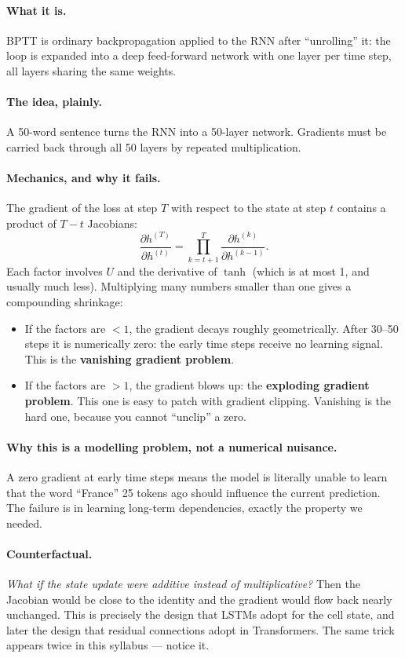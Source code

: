 \documentclass[11pt,a4paper]{article}
\begin{document}
\paragraph{What it is.} BPTT is ordinary backpropagation applied to the RNN after
``unrolling'' it: the loop is expanded into a deep feed-forward network with one layer per
time step, all layers sharing the same weights.

\paragraph{The idea, plainly.} A 50-word sentence turns the RNN into a 50-layer network.
Gradients must be carried back through all 50 layers by repeated multiplication.

\paragraph{Mechanics, and why it fails.} The gradient of the loss at step $T$ with respect
to the state at step $t$ contains a product of $T-t$ Jacobians:
\[
\frac{\partial h^{(T)}}{\partial h^{(t)}} = \prod_{k=t+1}^{T} \frac{\partial h^{(k)}}{\partial h^{(k-1)}}.
\]
Each factor involves $U$ and the derivative of $\tanh$ (which is at most 1, and usually
much less). Multiplying many numbers smaller than one gives a compounding shrinkage:
\begin{itemize}
\item If the factors are $<1$, the gradient decays roughly geometrically. After 30--50
  steps it is numerically zero: the early time steps receive no learning signal.
  This is the \textbf{vanishing gradient problem}.
\item If the factors are $>1$, the gradient blows up: the \textbf{exploding gradient
  problem}. This one is easy to patch with gradient clipping. Vanishing is the hard one,
  because you cannot ``unclip'' a zero.
\end{itemize}

\paragraph{Why this is a modelling problem, not a numerical nuisance.} A zero gradient at
early time steps means the model is literally unable to learn that the word ``France''
25 tokens ago should influence the current prediction. The failure is in learning long-term
dependencies, exactly the property we needed.

\paragraph{Counterfactual.} \emph{What if the state update were additive instead of
multiplicative?} Then the Jacobian would be close to the identity and the gradient would
flow back nearly unchanged. This is precisely the design that LSTMs adopt for the cell
state, and later the design that residual connections adopt in Transformers. The same trick
appears twice in this syllabus --- notice it.
\end{document}
